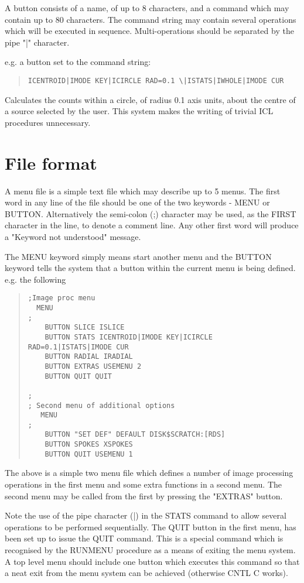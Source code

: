 \documentclass{book}
\renewcommand{\_}{{\tt\char'137}}     %
\begin{document}
A button consists of a name, of up to 8 characters, and a command which
may contain up to 80 characters. The command string may contain several
operations which will be executed in sequence. Multi-operations should be
separated by the pipe "|" character.
 
e.g. a button set to the command string:
\begin{quote}\begin{verbatim}
ICENTROID|IMODE KEY|ICIRCLE RAD=0.1 \|ISTATS|IWHOLE|IMODE CUR
\end{verbatim}\end{quote}
Calculates the counts within a circle, of radius 0.1 axis units, about the
centre of a source selected by the user. This system makes the writing of
trivial ICL procedures unnecessary.
 
\section{File format}
A menu file is a simple text file which may describe up to 5 menus.
The first word in any line of the file should be one of the two keywords -
MENU or BUTTON. Alternatively the semi-colon (;) character may be used,
as the FIRST character in the line, to denote a comment line. Any other
first word will produce a "Keyword not understood" message.
 
The MENU keyword simply means start another menu and the BUTTON keyword
tells the system that a button within the current menu is being defined.
e.g. the following
 
\begin{quote}\begin{verbatim}
;Image proc menu
  MENU
;
    BUTTON SLICE ISLICE
    BUTTON STATS ICENTROID|IMODE KEY|ICIRCLE RAD=0.1|ISTATS|IMODE CUR
    BUTTON RADIAL IRADIAL
    BUTTON EXTRAS USEMENU 2
    BUTTON QUIT QUIT
 
;
; Second menu of additional options
   MENU
;
    BUTTON "SET DEF" DEFAULT DISK$SCRATCH:[RDS]
    BUTTON SPOKES XSPOKES
    BUTTON QUIT USEMENU 1
\end{verbatim}\end{quote}
The above is a simple two menu file which defines a number of image
processing operations in the first menu and some extra functions in a
second menu. The second menu may be called from the first by pressing
the "EXTRAS" button.
 
Note the use of the pipe character (|) in the STATS command to
allow several operations to be performed sequentially. The QUIT
button in the first menu, has been set up to issue the QUIT command.
This is a special command which is recognised by the RUNMENU procedure as
a means of exiting the menu system. A top level menu should include one
button which executes this command so that a neat exit from the menu
system can be achieved (otherwise CNTL C works).
 
\end{document}
